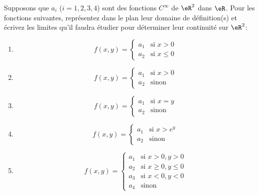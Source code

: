 
\begin{exercice}\label{exoLimSup0001}

	Supposons que $a_i$ ($i=1,2,3,4$) sont des fonctions $C^\infty$ de $\eR^2$ dans $\eR$. Pour les fonctions suivantes, représentez dans le plan leur domaine de définition(s) et écrivez les limites qu'il faudra étudier pour déterminer leur continuité sur $\eR^2$:

\begin{multicols}{2}
	\begin{enumerate}
	\item 
	\begin{equation}
		f(x,y)=
			\begin{cases}
		a_1	&	\text{si }x>0\\
		a_2	&	 \text{si }x\leq 0
	\end{cases}
	\end{equation}

	\item 
	\begin{equation}
		f(x,y)=
			\begin{cases}
		a_1	&	\text{si }x>0\\
		a_2	&	 \text{sinon}
	\end{cases}
	\end{equation}

	\item 
	\begin{equation}
		f(x,y)=
			\begin{cases}
		a_1	&	\text{si }x=y\\
		a_2	&	 \text{sinon}
	\end{cases}
	\end{equation}

	\item 
	\begin{equation}
		f(x,y)=
			\begin{cases}
		a_1	&	\text{si }x> e^{y}\\
		a_2	&	 \text{sinon}
	\end{cases}
	\end{equation}

	\item 
	\begin{equation}
		f(x,y)=
			\begin{cases}
		a_1	&	\text{si }x>0,y>0\\
		a_2	&	 \text{si }x\geq 0,y\leq 0\\
		a_3	&	 \text{si }x<0,y<0\\
		a_4	&	 \text{sinon}
	\end{cases}
	\end{equation}


\end{enumerate}
\end{multicols}
\end{exercice}
